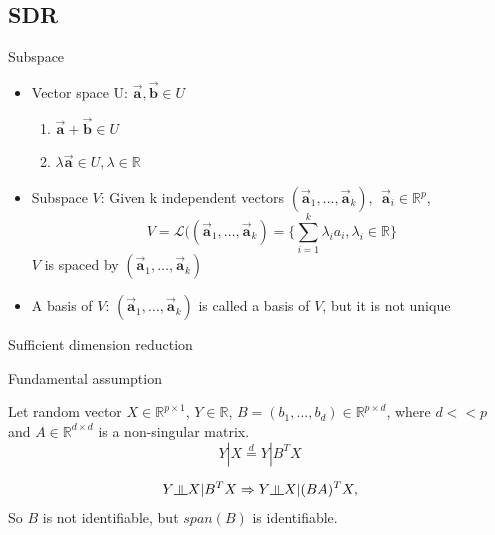 \documentclass[ignorenonframetext,]{beamer}
\providecommand{\tightlist}{%
  \setlength{\itemsep}{0pt}\setlength{\parskip}{0pt}}
\newcommand{\indep}{\rotatebox[origin=c]{90}{$\models$}}
\begin{document}
\subsection{SDR}\label{sdr}

\begin{frame}{Subspace}

\begin{itemize}
\item
  Vector space U: \(\vec{\mathbf{a}}, \vec{\mathbf{b}} \in U\)

  \begin{enumerate}
  \def\labelenumi{\arabic{enumi}.}
  \tightlist
  \item
    \(\vec{\mathbf{a}} + \vec{\mathbf{b}} \in U\)\\
  \item
    \(\lambda \vec{\mathbf{a}} \in U, \lambda \in \mathbb{R}\)
  \end{enumerate}
\item
  Subspace \(V\): Given k independent vectors
  \((\vec{\mathbf{a}}_1, \dots, \vec{\mathbf{a}}_k), ~~\vec{\mathbf{a}}_i \in \mathbb{R}^p\),
  \[
  V = \mathcal{L}((\vec{\mathbf{a}}_1, \dots, \vec{\mathbf{a}}_k) = \{\sum_{i = 1}^k\lambda_ia_i, \lambda_i\in \mathbb{R}\}
  \] \(V\) is spaced by
  \((\vec{\mathbf{a}}_1, \dots, \vec{\mathbf{a}}_k)\)
\item
  A basis of \(V\): \((\vec{\mathbf{a}}_1, \dots, \vec{\mathbf{a}}_k)\)
  is called a basis of \(V\), but it is not unique
\end{itemize}

\end{frame}

\begin{frame}{Sufficient dimension reduction}

\begin{block}{Fundamental assumption}

Let random vector \(X \in \mathbb{R}^{p \times 1}\),
\(Y \in \mathbb{R}\),
\(B = (b_1, \dots,b_d) \in \mathbb{R}^{p\times d}\), where \(d << p\)
and \(A \in \mathbb{R}^{d\times d}\) is a non-singular matrix. \[
Y|X \stackrel{d}{=} Y|B^T X
\]

\[
  Y \indep X|B^TX \Rightarrow Y \indep X|(BA)^TX, 
\] So \(B\) is not identifiable, but \(span(B)\) is identifiable.

\end{block}

\end{frame}
\end{document}
